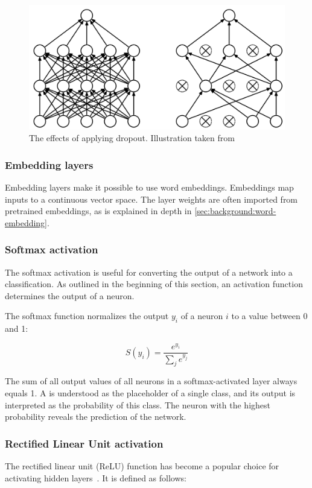 \begin{figure}
  \centering
  \includegraphics[width=\textwidth]{gfx/dropout-application.png}
  \caption[Effects of applying dropout]{The effects of applying dropout. Illustration taken from~\cite{srivastava2014dropout}}
  \label{fig:dropout-application}
\end{figure}

\subsubsection*{Embedding layers}
Embedding layers make it possible to use word embeddings.
Embeddings map inputs to a continuous vector space.
The layer weights are often imported from pretrained embeddings, as is explained in depth in \autoref{sec:background:word-embedding}.

\subsubsection*{Softmax activation}
The softmax activation is useful for converting the output of a network into a classification.
As outlined in the beginning of this section, an activation function determines the output of a neuron.

The softmax function normalizes the output $y_i$ of a neuron $i$ to a value between 0 and 1:

$$S(y_i) = \frac{e^{y_i}}{\sum_j e^{y_j}}$$

The sum of all output values of all neurons in a softmax-activated layer always equals 1.
A is understood as the placeholder of a single class, and its output is interpreted as the probability of this class.
The neuron with the highest probability reveals the prediction of the network.

\subsubsection*{Rectified Linear Unit activation}
The rectified linear unit (ReLU) function has become a popular choice for activating hidden layers~\cite{glorot2011deep}. It is defined as follows:

